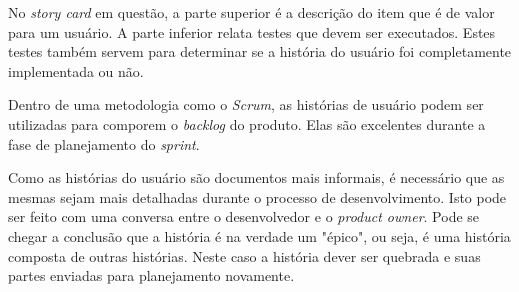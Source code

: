 No \emph{story card} em questão, a parte superior é a descrição do item que é de valor para um usuário. A parte inferior relata testes que devem ser executados. Estes testes também servem para determinar se a história do usuário foi completamente implementada ou não.

Dentro de uma metodologia como o \emph{Scrum}, as histórias de usuário podem ser utilizadas para comporem o \emph{backlog} do produto. Elas são excelentes durante a fase de planejamento do \emph{sprint}. 

Como as histórias do usuário são documentos mais informais, é necessário que as mesmas sejam mais detalhadas durante o processo de desenvolvimento. 
Isto pode ser feito com uma conversa entre o desenvolvedor e o \emph{product owner}. Pode se chegar a conclusão que a história é na verdade um "épico", ou seja, é uma história composta de outras histórias. Neste caso a história dever ser quebrada e suas partes enviadas para planejamento novamente. 


